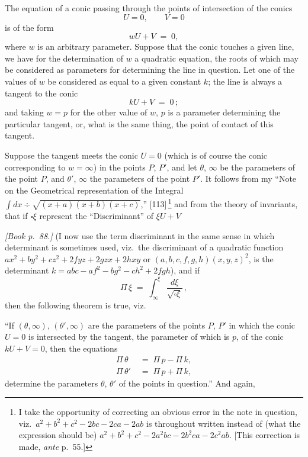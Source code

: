 \documentclass[11pt]{article}
\begin{document}
The equation of a conic passing through the points of intersection of the conics
\[
U = 0,\qquad V = 0
\]
is of the form
\[
w U + V \;=\; 0,
\]
where $w$ is an arbitrary parameter. Suppose that the conic touches a given line, we have for the determination of $w$ a quadratic equation, the roots of which may be considered as parameters for determining the line in question. Let one of the values of $w$ be considered as equal to a given constant $k$; the line is always a tangent to the conic
\[
k U + V \;=\; 0\,;
\]
and taking $w = p$ for the other value of $w$, $p$ is a parameter determining the particular tangent, or, what is the same thing, the point of contact of this tangent.

Suppose the tangent meets the conic $U = 0$ (which is of course the conic corresponding to $w = \infty$) in the points $P$, $P'$, and let $\theta$, $\infty$ be the parameters of the point $P$, and $\theta'$, $\infty$ the parameters of the point $P'$. It follows from my ``Note on the Geometrical representation of the Integral $\int dx \div \sqrt{(x + a)(x + b)(x + c)}$,'' [113]\,\footnote{I take the opportunity of correcting an obvious error in the note in question, viz.\ $a^{2} + b^{2} + c^{2} - 2bc - 2ca - 2ab$ is throughout written instead of (what the expression should be) $a^{2} + b^{2} + c^{2} - 2 a^{2} b c - 2 b^{2} c a - 2 c^{2} a b$. [This correction is made, \emph{ante} p.~55.]} and from the theory of invariants, that if $\square \xi$ represent the ``Discriminant'' of $\xi U + V$

\bigskip

\noindent\emph{[Book p.~88.]} (I now use the term discriminant in the same sense in which determinant is sometimes used, viz.\ the discriminant of a quadratic function $ax^{2} + by^{2} + cz^{2} + 2fyz + 2gzx + 2hxy$ or $(a, b, c, f, g, h)(x, y, z)^{2}$, is the determinant $k = abc - af^{2} - bg^{2} - ch^{2} + 2fgh$), and if
\[
\Pi\,\xi \;=\; \int_{\infty}^{\xi}\,\frac{d\xi}{\sqrt{\square\xi}}\,,
\]
then the following theorem is true, viz.

``If $(\theta, \infty)$, $(\theta', \infty)$ are the parameters of the points $P$, $P'$ in which the conic $U = 0$ is intersected by the tangent, the parameter of which is $p$, of the conic $kU + V = 0$, then the equations
\begin{align*}
\Pi\,\theta &\;=\; \Pi\,p - \Pi\,k,\\
\Pi\,\theta' &\;=\; \Pi\,p + \Pi\,k,
\end{align*}
determine the parameters $\theta$, $\theta'$ of the points in question.''  And again,
\end{document}
